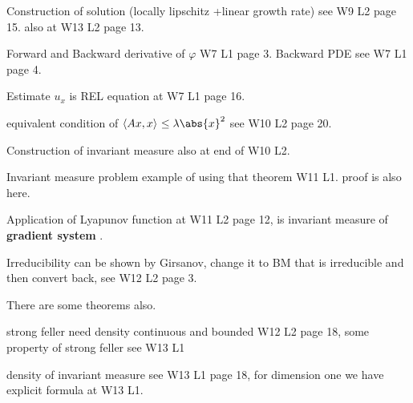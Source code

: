Construction of solution (locally lipschitz +linear growth rate) see W9 L2 page 15. also at W13 L2 page 13.

\newpage
Forward and Backward derivative of $\varphi$ W7 L1 page 3. Backward PDE see W7 L1 page 4.

Estimate $u_x$ is REL equation at W7 L1 page 16.

equivalent condition of $\qvar{A x,x}{} \leq \lambda \abs{x}^2$ see W10 L2 page 20.

Construction of invariant measure also at end of W10 L2.

Invariant measure problem example of using that theorem W11 L1. proof is also here.

Application of Lyapunov function at W11 L2 page 12, is invariant measure of \textbf{gradient system }.

Irreducibility can be shown by Girsanov, change it to BM that is irreducible and then convert back, see W12 L2 page 3.

There are some theorems also.

strong feller need density continuous and bounded W12 L2 page 18, some property of strong feller see W13 L1

density of invariant measure see W13 L1 page 18, for dimension one we have explicit formula at W13 L1.

